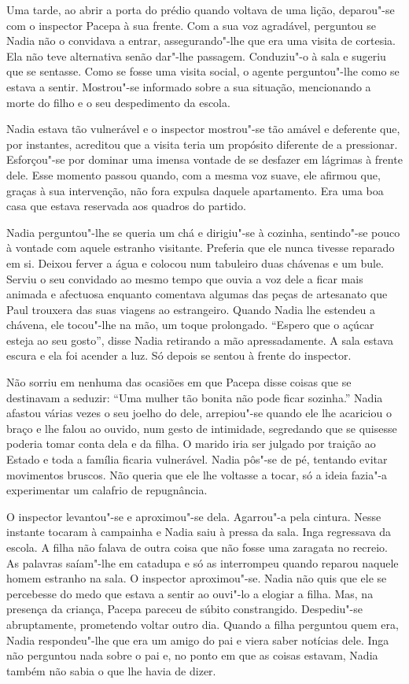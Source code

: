 Uma tarde, ao abrir a porta do prédio quando voltava de uma lição,
deparou"-se com o inspector Pacepa à sua frente. Com a sua voz agradável,
perguntou se Nadia não o convidava a entrar, assegurando"-lhe que era uma
visita de cortesia. Ela não teve alternativa senão dar"-lhe passagem.
Conduziu"-o à sala e sugeriu que se sentasse. Como se fosse uma visita
social, o agente perguntou"-lhe como se estava a sentir. Mostrou"-se
informado sobre a sua situação, mencionando a morte do filho e o seu
despedimento da escola.

Nadia estava tão vulnerável e o inspector mostrou"-se tão amável e
deferente que, por instantes, acreditou que a visita teria um propósito
diferente de a pressionar. Esforçou"-se por dominar uma imensa vontade de
se desfazer em lágrimas à frente dele. Esse momento passou quando, com
a mesma voz suave, ele afirmou que, graças à sua intervenção, não fora
expulsa daquele apartamento. Era uma boa casa que estava reservada aos
quadros do partido.

Nadia perguntou"-lhe se queria um chá e dirigiu"-se à cozinha, sentindo"-se
pouco à vontade com aquele estranho visitante. Preferia que ele nunca
tivesse reparado em si. Deixou ferver a água e colocou num tabuleiro
duas chávenas e um bule. Serviu o seu convidado ao mesmo tempo que
ouvia a voz dele a ficar mais animada e afectuosa enquanto comentava
algumas das peças de artesanato que Paul trouxera das suas viagens ao
estrangeiro. Quando Nadia lhe estendeu a chávena, ele tocou"-lhe na mão,
um toque prolongado. ``Espero que o açúcar esteja ao seu gosto'', disse
Nadia retirando a mão apressadamente.
A sala estava escura e ela foi acender a luz. Só depois se sentou à
frente do inspector.

Não sorriu em nenhuma das ocasiões em que Pacepa disse coisas que se
destinavam a seduzir: ``Uma mulher tão bonita não pode ficar sozinha.''
Nadia afastou várias vezes o seu joelho do dele, arrepiou"-se quando ele
lhe acariciou o braço e lhe falou ao ouvido, num gesto de intimidade, segredando que
se quisesse poderia tomar conta dela e da filha. O marido iria ser
julgado por traição ao Estado e toda a família ficaria vulnerável. Nadia
pôs"-se de pé, tentando evitar movimentos bruscos. Não queria que ele
lhe voltasse a tocar, só a ideia fazia"-a experimentar um calafrio de
repugnância.

O inspector levantou"-se e aproximou"-se dela. Agarrou"-a pela cintura.
Nesse instante tocaram à campainha e Nadia saiu à pressa da sala. Inga
regressava da escola. A filha não falava de outra coisa que não fosse
uma zaragata no recreio. As palavras saíam"-lhe em catadupa e só as
interrompeu quando reparou naquele homem estranho na sala. O inspector
aproximou"-se. Nadia não quis que ele se percebesse do medo que estava a
sentir ao ouvi"-lo a elogiar a filha. Mas, na presença da criança, Pacepa
pareceu de súbito constrangido. Despediu"-se abruptamente, prometendo
voltar outro dia. Quando a filha perguntou quem era, Nadia respondeu"-lhe
que era um amigo do pai e viera saber notícias dele. Inga não perguntou
nada sobre o pai e, no ponto em que as coisas estavam, Nadia também não
sabia o que lhe havia de dizer.



